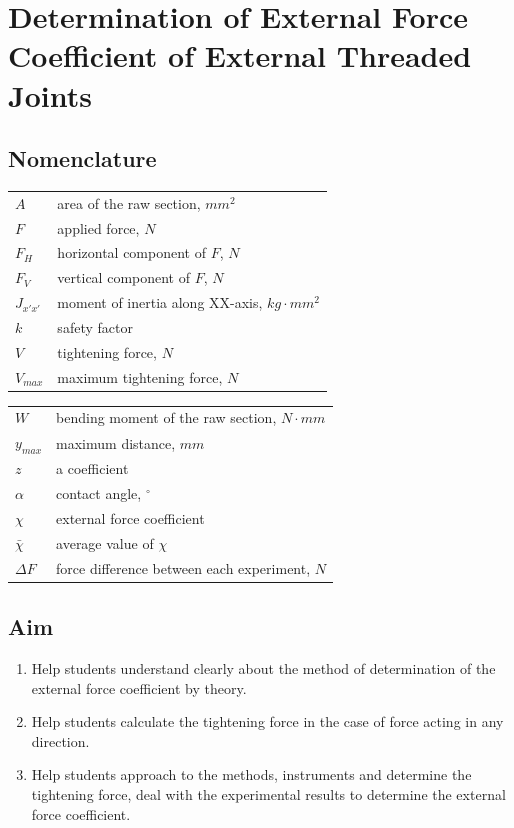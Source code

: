 \chapter{Determination of External Force Coefficient of  External Threaded Joints}
\section{Nomenclature}
	\begin{tabular}[t]{lp{7cm}}
		$ A $ & area of the raw section, $ \unit{mm^2} $\\
		$ F $ & applied force, $ \unit{N} $\\
		$ F_H $ & horizontal component of $ F $, $ \unit{N} $\\
		$ F_V $ & vertical component of $ F $, $ \unit{N} $\\
		$ J_{x'x'} $ & moment of inertia along XX-axis, $ \unit{kg\cdot mm^2} $\\
		$ k $ & safety factor\\
		$ V $ & tightening force, $ \unit{N} $\\
		$ V_{max} $ & maximum tightening force, $ \unit{N} $\\
		
	\end{tabular}
\begin{tabular}[t]{lp{7cm}}
	$ W $ & bending moment of the raw section, $ \unit{N\cdot mm} $\\
	$ y_{max} $ & maximum distance, $ \unit{mm} $\\
	$ z $ & a coefficient\\
	$ \alpha $ & contact angle, $ \unit{^\circ} $\\
	$ \chi $ & external force coefficient\\
	$ \bar{\chi} $ & average value of $ \chi $\\
	$ \Delta F $ & force difference between each experiment, $ \unit{N} $
\end{tabular}

\section{Aim}
\begin{enumerate}
	\item Help students understand clearly about the method of determination of the
	external force coefficient by theory.
	\item Help students calculate the tightening force in the case of force acting in any
	direction.
	\item Help students approach to the methods, instruments and determine the tightening
	force, deal with the experimental results to determine the external force
	coefficient.
\end{enumerate}

